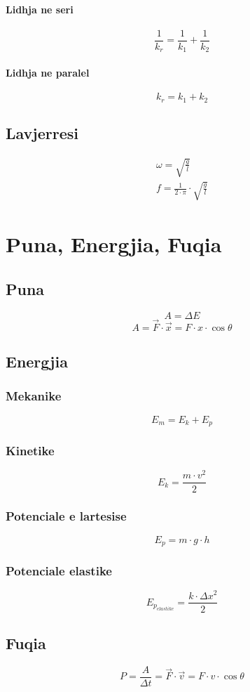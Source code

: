 \documentclass[a4paper, twocolumn]{article}
\begin{document}
\paragraph{Lidhja ne seri}
\[
\frac{1}{k_r}= \frac{1}{k_1}+\frac{1}{k_2}
\]
\paragraph{Lidhja ne paralel}
\[
k_r = k_1+k_2
\]
\subsection{Lavjerresi}
\begin{gather*}
	\omega = \sqrt{\frac{g}{l}} \\
	f = \frac{1}{2\cdot \pi} \cdot  \sqrt{\frac{g}{l}} 
\end{gather*}
\section{Puna, Energjia, Fuqia}
\subsection{Puna}
\[
A = \Delta E
\]
\[
	A = \vec{F} \cdot \vec{x} =   F   \cdot  x  \cdot \cos \theta
\]
\subsection{Energjia}
\subsubsection{Mekanike}
\[
E_m=E_k + E_p
\]
\subsubsection{Kinetike}
\[
E_k = \frac{m\cdot v^2}{2}
\]
\subsubsection{Potenciale e lartesise}
\[
E_p = m\cdot g\cdot h
\]
\subsubsection{Potenciale elastike}
\[
E_{p_{elastike}} = \frac{k\cdot \Delta x^2}{2}
\]
\subsection{Fuqia}
 \[
	 P=\frac{A}{\Delta t}=\vec{F}\cdot \vec{v}=F\cdot v\cdot \cos\theta
\]
\end{document}
